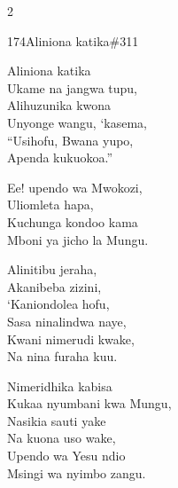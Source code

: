 \documentclass{article}
\begin{document}
\begin{multicols}{2}
\begin{hymn}{174}{Aliniona katika}{\#311}
\begin{stanza}
Aliniona katika\\
Ukame na jangwa tupu,\\
Alihuzunika kwona\\
Unyonge wangu, `kasema,\\
``Usihofu, Bwana yupo,\\
Apenda kukuokoa.''
\end{stanza}
\begin{chorus}
Ee! upendo wa Mwokozi,\\
Uliomleta hapa,\\
Kuchunga kondoo kama\\
Mboni ya jicho la Mungu.
\end{chorus}
\begin{stanza}
Alinitibu jeraha,\\
Akanibeba zizini,\\
`Kaniondolea hofu,\\
Sasa ninalindwa naye,\\
Kwani nimerudi kwake,\\
Na nina furaha kuu.
\end{stanza}
\begin{stanza}
Nimeridhika kabisa\\
Kukaa nyumbani kwa Mungu,\\
Nasikia sauti yake\\
Na kuona uso wake,\\
Upendo wa Yesu ndio\\
Msingi wa nyimbo zangu.
\end{stanza}
\end{hymn}


\end{multicols}
\end{document}
